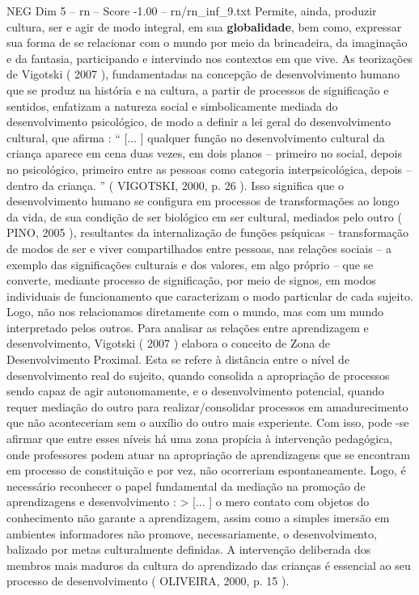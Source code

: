 \begin{textsample}{NEG Dim 5 – rn – Score -1.00 – rn/rn\_inf\_9.txt}
Permite, ainda, produzir cultura, ser e agir de modo integral, em sua \textbf{globalidade}, bem como, expressar sua forma de se relacionar com o mundo por meio da brincadeira, da imaginação e da fantasia, participando e intervindo nos contextos em que vive.
As teorizações de Vigotski ( 2007 ), fundamentadas na concepção de desenvolvimento humano que se produz na história e na cultura, a partir de processos de significação e sentidos, enfatizam a natureza social e simbolicamente mediada do desenvolvimento psicológico, de modo a definir a lei geral do desenvolvimento cultural, que afirma : “ [... ] qualquer função no desenvolvimento cultural da criança aparece em cena duas vezes, em dois planos – primeiro no social, depois no psicológico, primeiro entre as pessoas como categoria interpsicológica, depois – dentro da criança. ” ( VIGOTSKI, 2000, p. 26 ).
Isso significa que o desenvolvimento humano se configura em processos de transformações ao longo da vida, de sua condição de ser biológico em ser cultural, mediados pelo outro ( PINO, 2005 ), resultantes da internalização de funções psíquicas – transformação de modos de ser e viver compartilhados entre pessoas, nas relações sociais – a exemplo das significações culturais e dos valores, em algo próprio – que se converte, mediante processo de significação, por meio de signos, em modos individuais de funcionamento que caracterizam o modo particular de cada sujeito.
Logo, não nos relacionamos diretamente com o mundo, mas com um mundo interpretado pelos outros.
Para analisar as relações entre aprendizagem e desenvolvimento, Vigotski ( 2007 ) elabora o conceito de Zona de Desenvolvimento Proximal.
Esta se refere à distância entre o nível de desenvolvimento real do sujeito, quando consolida a apropriação de processos sendo capaz de agir autonomamente, e o desenvolvimento potencial, quando requer mediação do outro para realizar/consolidar processos em amadurecimento que não aconteceriam sem o auxílio do outro mais experiente.
Com isso, pode -se afirmar que entre esses níveis há uma zona propícia à intervenção pedagógica, onde professores podem atuar na apropriação de aprendizagens que se encontram em processo de constituição e por vez, não ocorreriam espontaneamente.
Logo, é necessário reconhecer o papel fundamental da mediação na promoção de aprendizagens e desenvolvimento : > [... ] o mero contato com objetos do conhecimento não garante a aprendizagem, assim como a simples imersão em ambientes informadores não promove, necessariamente, o desenvolvimento, balizado por metas culturalmente definidas.
A intervenção deliberada dos membros mais maduros da cultura do aprendizado das crianças é essencial ao seu processo de desenvolvimento ( OLIVEIRA, 2000, p. 15 ).

\end{textsample}
